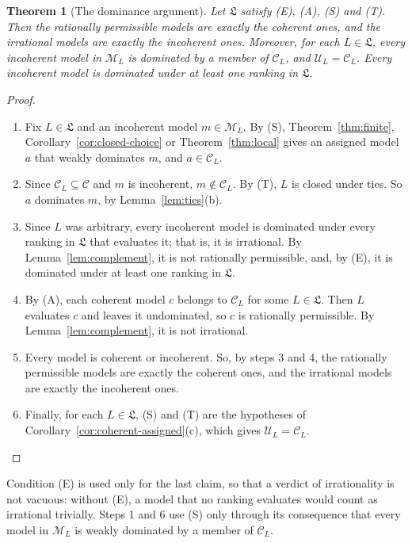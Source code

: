\documentclass[11pt]{article}
\newtheorem{theorem}{Theorem}[section]
\theoremstyle{definition}
\newcommand{\M}{\mathcal M}
\newcommand{\C}{\mathcal C}
\newcommand{\U}{\mathcal U}
\newcommand{\Lf}{\mathfrak L}
\begin{document}
\begin{theorem}[The dominance argument]\label{thm:argument}
Let $\Lf$ satisfy (E), (A), (S) and (T). Then the rationally permissible models are exactly the coherent ones, and the irrational models are exactly the incoherent ones. Moreover, for each $L\in\Lf$, every incoherent model in $\M_L$ is dominated by a member of $\C_L$, and $\U_L=\C_L$. Every incoherent model is dominated under at least one ranking in $\Lf$.
\end{theorem}
\begin{proof}
\leavevmode
\begin{enumerate}[label=\arabic*.,leftmargin=*]
\item Fix $L\in\Lf$ and an incoherent model $m\in\M_L$. By (S), Theorem~\ref{thm:finite}, Corollary~\ref{cor:closed-choice} or Theorem~\ref{thm:local} gives an assigned model $a$ that weakly dominates $m$, and $a\in\C_L$.
\item Since $\C_L\subseteq\C$ and $m$ is incoherent, $m\notin\C_L$. By (T), $L$ is closed under ties. So $a$ dominates $m$, by Lemma~\ref{lem:ties}(b).
\item Since $L$ was arbitrary, every incoherent model is dominated under every ranking in $\Lf$ that evaluates it; that is, it is irrational. By Lemma~\ref{lem:complement}, it is not rationally permissible, and, by (E), it is dominated under at least one ranking in $\Lf$.
\item By (A), each coherent model $c$ belongs to $\C_L$ for some $L\in\Lf$. Then $L$ evaluates $c$ and leaves it undominated, so $c$ is rationally permissible. By Lemma~\ref{lem:complement}, it is not irrational.
\item Every model is coherent or incoherent. So, by steps 3 and 4, the rationally permissible models are exactly the coherent ones, and the irrational models are exactly the incoherent ones.
\item Finally, for each $L\in\Lf$, (S) and (T) are the hypotheses of Corollary~\ref{cor:coherent-assigned}(c), which gives $\U_L=\C_L$.\qedhere
\end{enumerate}
\end{proof}

Condition (E) is used only for the last claim, so that a verdict of irrationality is not vacuous: without (E), a model that no ranking evaluates would count as irrational trivially. Steps 1 and 6 use (S) only through its consequence that every model in $\M_L$ is weakly dominated by a member of $\C_L$.
\end{document}
